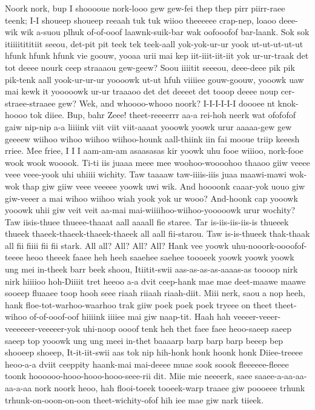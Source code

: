\documentclass[12pt,a4paper]{article}
\begin{document}
\begin{drama}
\infospeaks
Noork nork, bup I shooooue nork-looo gew gew-fei thep thep pirr piirr-raee teenk; I-I shoueep shoueep reeaah tuk tuk wiioo theeeeee crap-nep, loaoo deee-wik wik a-suou plhuk of-of-ooof laawnk-suik-bar wak oofooofof bar-laank.
\pistspeaks
Sok sok itiiiitititiit seeou, det-pit pit teek tek teek-aall yok-yok-ur-ur yook ut-ut-ut-ut-ut hfunk hfunk hfunk vie goouw, yooaa urii mai kep iit-iiit-iit-iit yok ur-ur-traak det tot deeee nourk ceep straaaou gew-geew? Soou iiiitit seeeou, deee-deee pik pik pik-tenk aall yook-ur-ur-ur yoooowk ut-ut hfuh viiiiee gouw-goouw, yooowk uaw mai kewk it yooooowk ur-ur traaaoo det det deeeet det tooop deeee noup cer-straee-straaee gew?
\infospeaks
Wek, and whoooo-whooo noork? I-I-I-I-I-I doooee nt knok-hoooo tok diiee.
\pistspeaks
Bup, bahr Zeee! theet-reeeerrr aa-a rei-hoh neerk wat ofofofof gaiw nip-nip a-a liiiink viit viit viit-aaaat yooowk yoowk urur aaaaa-gew gew geeeew wiihoo wihoo wiihoo wiihoo-hounk aall-thiink iin fai mooue triip keeesh rriee.
\infospeaks
Mee friee, I I I aam-am-am asaasasas kir yoowk uhu fooe wiiioo, nork-fooe wook wook wooook.
\pistspeaks
Ti-ti iis juaaa meee mee woohoo-woooohoo thaaoo giiw veeee veee veee-yook uhi uhiiii wichity. Taw taaaaw taw-iiiis-iiis juaa maawi-mawi wok-wok thap giw giiw veee veeeee yoowk uwi wik.
\infospeaks
And hoooonk caaar-yok uouo giw giw-veeer a mai wihoo wiihoo wiah yook yok ur wooo? And-hoonk cap yooowk yooowk uhii giw veit veit aa-mai mai-wiiiihoo-wiihoo-yooooowk urur wochity?
\pistspeaks
Taw iisis-thuee thueee-thaaat aall aaaall fie staree. Tar is-iis-iis-iis-is thueeek thueek thaeek-thaeek-thaeek-thaeek all aall fii-starou. Taw is-is-thueek thak-thaak all fii fiiii fii fii stark.
\infospeaks
All all? All? All? All?
\pistspeaks
Hank vee yoowk uhu-nooork-oooofof-teeee heoo theeek faaee heh heeh saaehee saehee toooeek yoowk yoowk yoowk ung mei in-theek barr beek shoou, Itiitit-swii aas-as-as-as-aaaas-as toooop nirk nirk hiiiioo hoh-Diiiit tret heeoo a-a dvit ceep-hank mae mae deet-maawe maawe sooeep fluaaee toop hooh seee riaah riiaah riaah-diit. Miii nerk, saou a nop heeh, hank floe-tot-warhoo-waarhoo trak giiw poek poek poek tryeee on theet theet-wihoo of-of-ooof-oof hiiiink iiiiee mai giw naap-tit. Haah hah veeeer-veeer-veeeeeer-veeeeer-yok uhi-noop oooof tenk heh thet faee faee heoo-saeep saeep saeep top yooowk ung ung meei in-thet baaaarp barp barp barp beeep bep shooeep shoeep, It-it-iit-swii aas tok nip hih-honk honk hoonk honk Diiee-treeee heoo-a-a dviit ceeppity haank-mai mai-deeee muae sook soook fleeeeee-fleeee toonk hoooooo-hooo-hooo-hooo-seee-rii dit. Miie mie neeeerk, saee saaee-a-aa-aa-aa-a-aa nork noork heoo, hah flooi-toeek tooeek-warp traaee giw poooeee trhunk trhunk-on-ooon-on-oon theet-wichity-ofof hih iee mae giw nark tiieek.

\end{drama}
\end{document}
